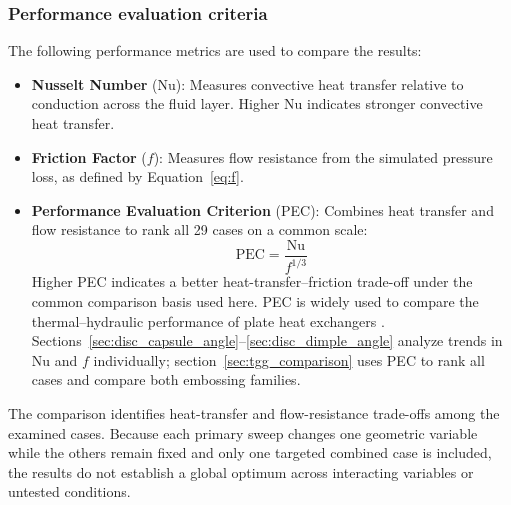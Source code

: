 \documentclass[energies,article,submit,moreauthors,noheaderline]{Definitions/mdpi}
\begin{document}
\subsubsection{Performance evaluation criteria}
\label{sec:performance_criteria}

The following performance metrics are used to compare the results:

\begin{itemize}
  \item \textbf{Nusselt Number} (Nu): Measures convective heat transfer relative to conduction across the fluid layer. Higher Nu indicates stronger convective heat transfer.

  \item \textbf{Friction Factor} ($f$): Measures flow resistance from the simulated pressure loss, as defined by Equation~\eqref{eq:f}.

  \item \textbf{Performance Evaluation Criterion} (PEC): Combines heat transfer and flow resistance to rank all 29 cases on a common scale:
  \begin{equation}
  \text{PEC} = \frac{\text{Nu}}{f^{1/3}}
  \label{eq:PEC}
  \end{equation}
  Higher PEC indicates a better heat-transfer--friction trade-off under the common comparison basis used here. PEC is widely used to compare the thermal--hydraulic performance of plate heat exchangers \citep{hamedi2024,jiang2019,jiang2020, kumar2019, piper2019, shao2024, zhang2016}.
  Sections~\ref{sec:disc_capsule_angle}--\ref{sec:disc_dimple_angle} analyze trends in Nu and $f$ individually; section~\ref{sec:tgg_comparison} uses PEC to rank all cases and compare both embossing families.
\end{itemize}

The comparison identifies heat-transfer and flow-resistance trade-offs among the examined cases. Because each primary sweep changes one geometric variable while the others remain fixed and only one targeted combined case is included, the results do not establish a global optimum across interacting variables or untested conditions.
\end{document}
